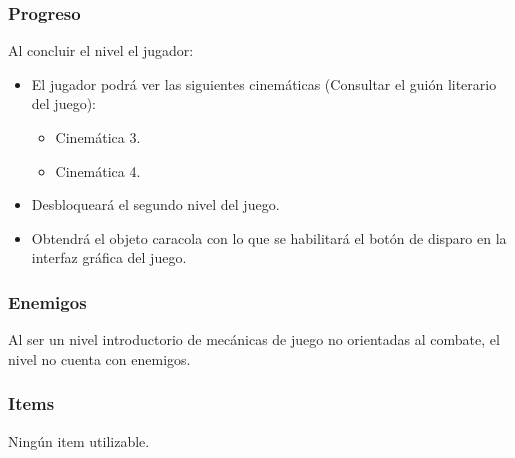 \documentclass[11pt,letterpaper]{article}
\begin{document}
	\subsubsection{Progreso}
	Al concluir el nivel el jugador:
\begin{itemize}
	\item El jugador podrá ver las siguientes cinemáticas (Consultar el guión literario del juego):
	\begin{itemize}
		\item Cinemática 3.
		\item Cinemática 4.
	\end{itemize}
\item Desbloqueará el segundo nivel del juego.
\item Obtendrá el objeto caracola con lo que se habilitará el botón de disparo en la interfaz gráfica del juego.
\end{itemize}
	\subsubsection{Enemigos}
Al ser un nivel introductorio de mecánicas de juego no orientadas al combate, el nivel no cuenta con enemigos.
	\subsubsection{Items}
Ningún item utilizable.
\end{document}
